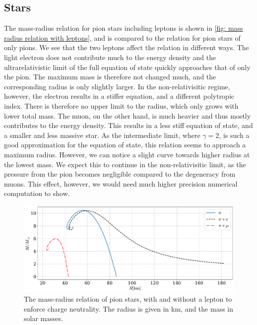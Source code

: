 \subsection{Stars}


The mass-radius relation for pion stars including leptons is shown in \autoref{fig: mass radius relation with leptons}, and is compared to the relation for pion stars of only pions.
We see that the two leptons affect the relation in different ways.
The light electron does not contribute much to the energy density and the ultrarelativistic limit of the full equation of state quickly approaches that of only the pion. The maximum mass is therefore not changed much, and the corresponding radius is only slightly larger.
In the non-relativisitic regime, however, the electron results in a stiffer equation, and a different polytropic index.
There is therefore no upper limit to the radius, which only grows with lower total mass.
The muon, on the other hand, is much heavier and thus mostly contributes to the energy density.
This results in a less stiff equation of state, and a smaller and less massive star.
As the intermediate limit, where $\gamma = 2$, is such a good approximation for the equation of state, this relation seems to approach a maximum radius.
However, we can notice a slight curve towards higher radius at the lowest mass.
We expect this to continue in the non-relativisitic limit, as the pressure from the pion becomes negligible compared to the degeneracy from muons.
This effect, however, we would need much higher precision numerical computation to show.


\begin{figure}
    \centering
    \includegraphics[width=\textwidth]{../scripts/figurer/pion_star/mass_radius_lepton.pdf}
    \caption{
        The mass-radius relation of pion stars, with and without a lepton to enforce charge neutrality.
        The radius is given in km, and the mass in solar masses.
        }
        \label{fig: mass radius relation with leptons}
\end{figure}

